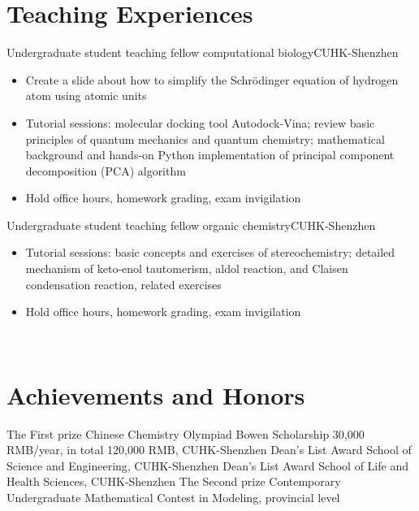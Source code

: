 \documentclass[12pt,a4paper,sans]{moderncv}
\newcommand\linksymbol{\scriptsize\faExternalLink*}
\newcommand{\cvsection}[1]{\section{{#1}}}
\begin{document}
\cvsection{Teaching Experiences}
{Undergraduate student teaching fellow}{}
{computational biology}{CUHK-Shenzhen}
{
    \begin{itemize}[itemsep=2pt]
        \item Create a slide about how to simplify the Schrödinger equation of hydrogen atom using
        atomic units
        \item Tutorial sessions: molecular docking tool Autodock-Vina;
        review basic principles of quantum mechanics and quantum chemistry;
        mathematical background and hands-on Python implementation of principal component decomposition (PCA) algorithm
        \href{https://github.com/haoran0115/pca-implementation}{\linksymbol}
        \item Hold office hours, homework grading, exam invigilation
    \end{itemize}
}
\vspace{0.5em}
{Undergraduate student teaching fellow}{}
{organic chemistry}{CUHK-Shenzhen}
{
    \begin{itemize}[itemsep=2pt]
        \item Tutorial sessions: basic concepts and exercises of stereochemistry;
        detailed mechanism of keto-enol tautomerism, aldol reaction,
        and Claisen condensation reaction, related exercises
        \item Hold office hours, homework grading, exam invigilation
    \end{itemize}
}
\
\cvsection{Achievements and Honors}
{The First prize}{}
{Chinese Chemistry Olympiad}{}
{}
{Bowen Scholarship}{}
{30,000 RMB/year, in total 120,000 RMB, CUHK-Shenzhen}{}
{}
{Dean's List Award}{}
{School of Science and Engineering, CUHK-Shenzhen}{}
{}
{Dean's List Award}{}
{School of Life and Health Sciences, CUHK-Shenzhen}{}
{}
{The Second prize}{}
{Contemporary Undergraduate Mathematical Contest in Modeling, provincial level}{}
{}

\end{document}
